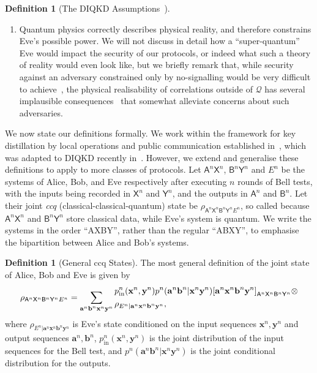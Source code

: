 \documentclass[10pt, a4paper]{article}
\numberwithin{equation}{section} %
\newcounter{stmt} %
\theoremstyle{definition}
\newtheorem{defn}[stmt]{Definition}
\theoremstyle{plain}
\newcommand{\restatableeq}[3]{\label{#3}#2\gdef#1{#2\tag{\ref{#3}}}} %
\newcommand{\?}{\mathrel{?}} %
\newcommand{\cvec}[1]{\boldsymbol{\mathbf{#1}}}    %
\newcommand{\crv}[1]{\mathsf{#1}}
\newcommand{\proj}[2][]{{[#2]}_{#1}}
\newcommand{\Qs}{\mathcal{Q}}
\newcommand{\prin}[1][p]{#1_{\mathrm{in}}}
\begin{document}
\begin{defn}[{The DIQKD Assumptions~\cite{DI_Proofs}}]
\begin{enumerate}
        \item Quantum physics correctly describes physical reality, and therefore constrains Eve's possible power. We will not discuss in detail how a ``super-quantum'' Eve would impact the security of our protocols, or indeed what such a theory of reality would even look like, but we briefly remark that, while security against an adversary constrained only by no-signalling would be very difficult to achieve~\cite{NSMemory, NSPAImpossible, ConsecutiveCKD}, the physical realisability of correlations outside of \(\Qs\) has several implausible consequences~\cite{ImplausibleConseq} that somewhat alleviate concerns about such adversaries.\label{assum:qcorrect}
      \end{enumerate}
    \end{defn}

    We now state our definitions formally. We work within the framework for key distillation by local operations and public communication established in~\cite{CQKeyDistill}, which was adapted to DIQKD recently in~\cite{DIQKD_Limits}. However, we extend and generalise these definitions to apply to more classes of protocols. Let \(\crv{A}^{n}\crv{X}^{n}\), \(\crv{B}^{n}\crv{Y}^{n}\) and \(E^n\) be the systems of Alice, Bob, and Eve respectively after executing \(n\) rounds of Bell tests, with the inputs being recorded in \(\crv{X}^{n}\) and \(\crv{Y}^{n}\), and the outputs in \(\crv{A}^{n}\) and \(\crv{B}^{n}\). Let their joint \emph{ccq} (classical-classical-quantum) state be \(\rho_{\crv{A}^n\crv{X}^n \crv{B}^n\crv{Y}^n E^n}\), so called because \(\crv{A}^n\crv{X}^n\) and \(\crv{B}^n\crv{Y}^n\) store classical data, while Eve's system is quantum. We write the systems in the order ``AXBY'', rather than the regular ``ABXY'', to emphasise the bipartition between Alice and Bob's systems.

    \begin{defn}[General ccq States]\label{def:ccq_belltest}
      The most general definition of the joint state of Alice, Bob and Eve is given by
      \begin{equation}
        \restatableeq{\bellccq}{
          \rho_{\crv{A}^n\crv{X}^n \crv{B}^n\crv{Y}^n E^n} = \sum_{\cvec{a}^n\cvec{b}^n \cvec{x}^n\cvec{y}^n} \begin{aligned}[c]
          & \prin^n(\cvec{x}^n,\cvec{y}^n) p^n(\cvec{a}^n\cvec{b}^n|\cvec{x}^n\cvec{y}^n) \proj[\crv{A}^n\crv{X}^n \crv{B}^n\crv{Y}^n]{\cvec{a}^n\cvec{x}^n \cvec{b}^n\cvec{y}^n} \otimes \\
          & \rho_{E^n|\cvec{a}^n\cvec{x}^n \cvec{b}^n\cvec{y}^n},
          \end{aligned}
        }{eqn:bellccq}
      \end{equation}
      where \(\rho_{E^n|\cvec{a}^n\cvec{x}^n \cvec{b}^n\cvec{y}^n}\) is Eve's state conditioned on the input sequences \(\cvec{x}^n, \cvec{y}^n\) and output sequences \(\cvec{a}^n, \cvec{b}^n\), \(\prin^n(\cvec{x}^n, \cvec{y}^n)\) is the joint distribution of the input sequences for the Bell test, and \(p^n(\cvec{a}^n \cvec{b}^n|\cvec{x}^n \cvec{y}^n)\) is the joint conditional distribution for the outputs.
    \end{defn}
\end{document}
